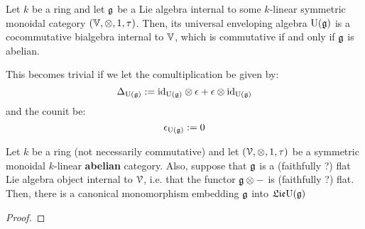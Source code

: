             \begin{remark} \label{remark: universal_enveloping_algebras_are_bialgebras}
                Let $k$ be a ring and let $\mathfrak{g}$ be a Lie algebra internal to some $k$-linear symmetric monoidal category $(\V, \tensor, 1, \tau)$. Then, its universal enveloping algebra $\mathrm{U}(\mathfrak{g})$ is a cocommutative bialgebra internal to $\mathbb{V}$, which is commutative if and only if $\mathfrak{g}$ is abelian. 
                
                This becomes trivial if we let the comultiplication be given by:
                    $$\Delta_{\U(\g)} := \id_{\U(\g)} \tensor \e + \e \tensor \id_{\U(\g)}$$
                and the counit be:
                    $$\epsilon_{\mathrm{U}(\mathfrak{g})} := 0$$
            \end{remark}
                
            \begin{lemma}
                Let $k$ be a ring (not necessarily commutative) and let $(\calV, \tensor, 1, \tau)$ be a symmetric monoidal $k$-linear \textbf{abelian} category. Also, suppose that $\mathfrak{g}$ is a (faithfully ?) flat Lie algebra object internal to $\mathcal{V}$, i.e. that the functor $\g \tensor -$ is (faithfully ?) flat. Then, there is a canonical monomorphism embedding $\mathfrak{g}$ into $\mathfrak{Lie} \mathrm{U}(\mathfrak{g})$
            \end{lemma}
                \begin{proof}
                \end{proof}
            
